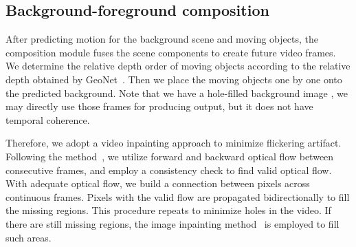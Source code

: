 \documentclass[10pt,twocolumn,letterpaper]{article}
\begin{document}
\subsection{Background-foreground composition}
After predicting motion for the background scene and moving objects, the composition module fuses the scene components to create future video frames. We determine the relative depth order of moving objects according to the relative depth obtained by GeoNet~\cite{yin2018geonet}. Then we place the moving objects one by one onto the predicted background. Note that we have a hole-filled background image , we may directly use those frames for producing output, but it does not have temporal coherence. 

Therefore, we adopt a video inpainting approach to minimize flickering artifact. Following the method~\cite{Xu_2019_CVPR}, we utilize forward and backward optical flow between consecutive frames, and employ a consistency check to find valid optical flow. With adequate optical flow, we build a connection between pixels across continuous frames. Pixels with the valid flow are propagated bidirectionally to fill the missing regions. 
This procedure repeats to minimize holes in the video. If there are still missing regions, the image inpainting method~\cite{yu2018generative} is employed to fill such areas. 
\end{document}

